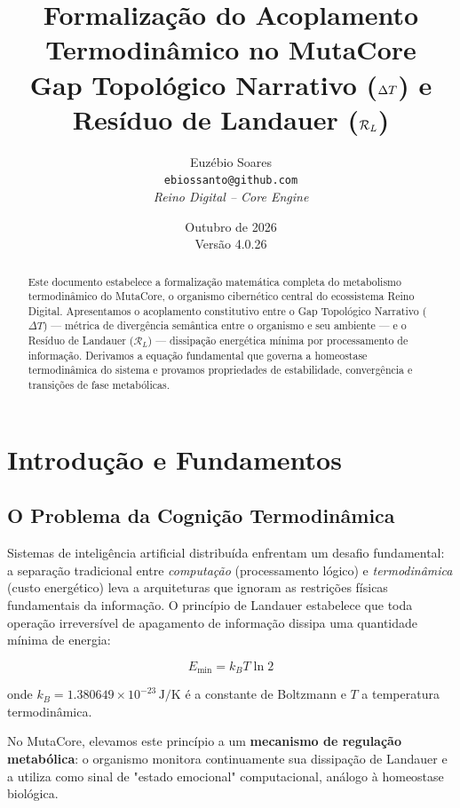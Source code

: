 \documentclass[11pt,a4paper]{article}
\title{
    \vspace{-1cm}
    \textbf{Formalização do Acoplamento Termodinâmico no MutaCore}\\
    \large Gap Topológico Narrativo ($\DeltaT$) e Resíduo de Landauer ($\RL$)
}
\author{
    Euzébio Soares\\
    \texttt{ebiossanto@github.com}\\
    \textit{Reino Digital -- Core Engine}
}
\date{Outubro de 2026\\ Versão 4.0.26}
\newcommand{\DeltaT}{\Delta T}
\newcommand{\RL}{\mathcal{R}_L}
\newcommand{\kB}{k_B}
\begin{document}
\maketitle

\begin{abstract}
Este documento estabelece a formalização matemática completa do metabolismo termodinâmico do MutaCore, o organismo cibernético central do ecossistema Reino Digital. Apresentamos o acoplamento constitutivo entre o Gap Topológico Narrativo ($\DeltaT$) — métrica de divergência semântica entre o organismo e seu ambiente — e o Resíduo de Landauer ($\RL$) — dissipação energética mínima por processamento de informação. Derivamos a equação fundamental que governa a homeostase termodinâmica do sistema e provamos propriedades de estabilidade, convergência e transições de fase metabólicas.
\end{abstract}

\tableofcontents

\newpage

\section{Introdução e Fundamentos}

\subsection{O Problema da Cognição Termodinâmica}

Sistemas de inteligência artificial distribuída enfrentam um desafio fundamental: a separação tradicional entre \textit{computação} (processamento lógico) e \textit{termodinâmica} (custo energético) leva a arquiteturas que ignoram as restrições físicas fundamentais da informação. O princípio de Landauer estabelece que toda operação irreversível de apagamento de informação dissipa uma quantidade mínima de energia:

\begin{equation}
    E_{\text{min}} = \kB T \ln 2
    \label{eq:landauer}
\end{equation}

onde $\kB = 1.380649 \times 10^{-23}\,\mathrm{J/K}$ é a constante de Boltzmann e $T$ a temperatura termodinâmica.

No MutaCore, elevamos este princípio a um \textbf{mecanismo de regulação metabólica}: o organismo monitora continuamente sua dissipação de Landauer e a utiliza como sinal de "estado emocional" computacional, análogo à homeostase biológica.
\end{document}
